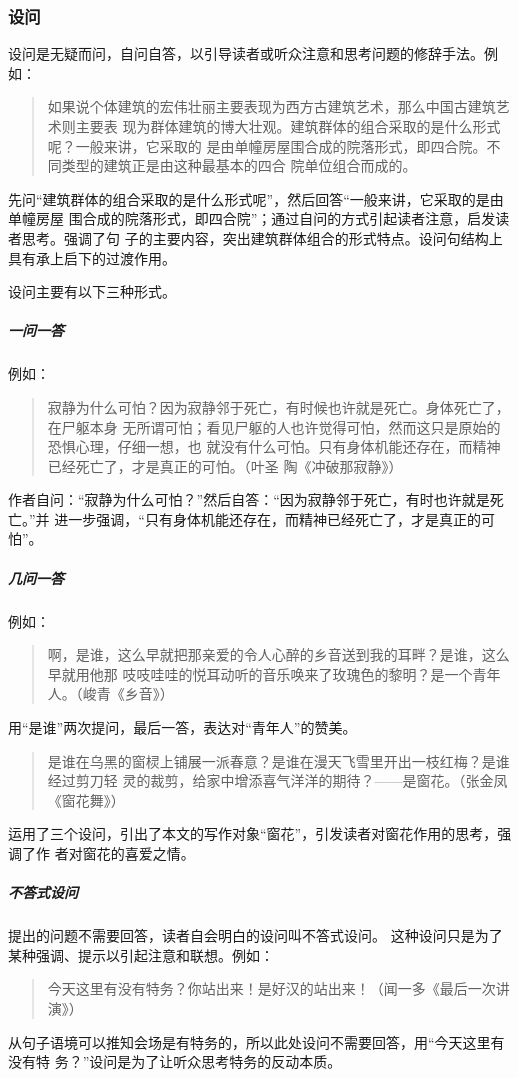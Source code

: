 \documentclass[final,oneside]{ctexbook}
\newenvironment{equotation}{\begin{quotation}\kaishu}{\end{quotation}}
\begin{document}
\subsubsection{设问}

设问是无疑而问，自问自答，以引导读者或听众注意和思考问题的修辞手法。例如：

\begin{equotation}
  如果说个体建筑的宏伟壮丽主要表现为西方古建筑艺术，那么中国古建筑艺术则主要表
  现为群体建筑的博大壮观。建筑群体的组合采取的是什么形式呢？一般来讲，它采取的
  是由单幢房屋围合成的院落形式，即四合院。不同类型的建筑正是由这种最基本的四合
  院单位组合而成的。
\end{equotation}
先问“建筑群体的组合采取的是什么形式呢”，然后回答“一般来讲，它采取的是由单幢房屋
围合成的院落形式，即四合院”；通过自问的方式引起读者注意，启发读者思考。强调了句
子的主要内容，突出建筑群体组合的形式特点。设问句结构上具有承上启下的过渡作用。

设问主要有以下三种形式。

\subparagraph{一问一答}例如：

\begin{equotation}
  寂静为什么可怕？因为寂静邻于死亡，有时候也许就是死亡。身体死亡了，在尸躯本身
  无所谓可怕；看见尸躯的人也许觉得可怕，然而这只是原始的恐惧心理，仔细一想，也
  就没有什么可怕。只有身体机能还存在，而精神已经死亡了，才是真正的可怕。（叶圣
  陶《冲破那寂静》）
\end{equotation}
作者自问：“寂静为什么可怕？”然后自答：“因为寂静邻于死亡，有时也许就是死亡。”并
进一步强调，“只有身体机能还存在，而精神已经死亡了，才是真正的可怕”。

\subparagraph{几问一答}例如：

\begin{equotation}
  啊，是谁，这么早就把那亲爱的令人心醉的乡音送到我的耳畔？是谁，这么早就用他那
  吱吱哇哇的悦耳动听的音乐唤来了玫瑰色的黎明？是一个青年人。（峻青《乡音》）
\end{equotation}
用“是谁”两次提问，最后一答，表达对“青年人”的赞美。

\begin{equotation}
  是谁在乌黑的窗棂上铺展一派春意？是谁在漫天飞雪里开出一枝红梅？是谁经过剪刀轻
  灵的裁剪，给家中增添喜气洋洋的期待？——是窗花。（张金凤《窗花舞》）
\end{equotation}
运用了三个设问，引出了本文的写作对象“窗花”，引发读者对窗花作用的思考，强调了作
者对窗花的喜爱之情。

\subparagraph{不答式设问}提出的问题不需要回答，读者自会明白的设问叫不答式设问。
这种设问只是为了某种强调、提示以引起注意和联想。例如：
\begin{equotation}
  今天这里有没有特务？你站出来！是好汉的站出来！（闻一多《最后一次讲演》）
\end{equotation}
从句子语境可以推知会场是有特务的，所以此处设问不需要回答，用“今天这里有没有特
务？”设问是为了让听众思考特务的反动本质。
\end{document}
